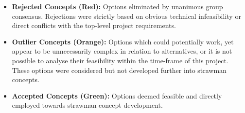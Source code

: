 \begin{itemize}
    \item \textbf{Rejected Concepts (Red):} Options eliminated by unanimous group consensus. Rejections were strictly based on obvious technical infeasibility or direct conflicts with the top-level project requirements.
    \item \textbf{Outlier Concepts (Orange):} Options which could potentially work, yet appear to be unnecessarily complex in relation to alternatives, or it is not possible to analyse their feasibility within the time-frame of this project. These options were considered but not developed further into strawman concepts.
    \item \textbf{Accepted Concepts (Green):} Options deemed feasible and directly employed towards strawman concept development.
\end{itemize}

